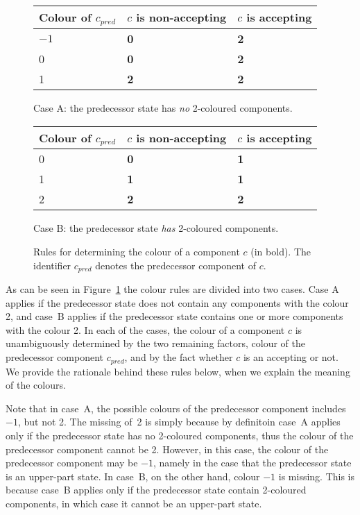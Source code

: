 \begin{figure}[htb]
\centering
  \begin{subtable}[t]{\textwidth}
  \renewcommand{\arraystretch}{1.3}
  \centering
  \begin{tabular}{|C{3cm}|C{3cm}|C{3cm}|}
    \hline
    Colour of $c_{pred}$ & $c$ is non-accepting & $c$ is accepting \\
    \hline
    $-1$ & \textbf{0} & \textbf{2} \\
    0 & \textbf{0} & \textbf{2} \\
    1 & \textbf{2} & \textbf{2} \\
    \hline
  \end{tabular}
  \caption{Case A: the predecessor state has \textit{no} 2-coloured components.}
  \end{subtable}
  \vskip0.5cm

  \begin{subtable}[t]{\textwidth}
  \renewcommand{\arraystretch}{1.3}
  \centering
  \begin{tabular}{|C{3cm}|C{3cm}|C{3cm}|}
    \hline
    Colour of $c_{pred}$ & $c$ is non-accepting & $c$ is accepting \\
     & \textbf{0} & \textbf{1} \\
    1 & \textbf{1} & \textbf{1} \\
    2 & \textbf{2} & \textbf{2} \\
    \hline
  \end{tabular}
  \caption{Case B: the predecessor state \textit{has} 2-coloured components.}
  \end{subtable}
\caption{Rules for determining the colour of a component $c$ (in bold). The identifier $c_{pred}$ denotes the predecessor component of $c$.}
\label{colour_rules}
\end{figure}

As can be seen in Figure~\ref{colour_rules} the colour rules are divided into two cases. Case A applies if the predecessor state does not contain any components with the colour 2, and case~B applies if the predecessor state contains one or more components with the colour 2. In each of the cases, the colour of a component $c$ is unambiguously determined by the two remaining factors, colour of the predecessor component $c_{pred}$, and by the fact whether $c$ is an accepting or not. We provide the rationale behind these rules below, when we explain the meaning of the colours.

Note that in case~A, the possible colours of the predecessor component includes $-1$, but not 2. The missing of~2 is simply because by definitoin case~A applies only if the predecessor state has no 2-coloured components, thus the colour of the predecessor component cannot be 2. However, in this case, the colour of the predecessor component may be $-1$, namely in the case that the predecessor state is an upper-part state. In case~B, on the other hand, colour $-1$ is missing. This is because case~B applies only if the predecessor state contain 2-coloured components, in which case it cannot be an upper-part state.

